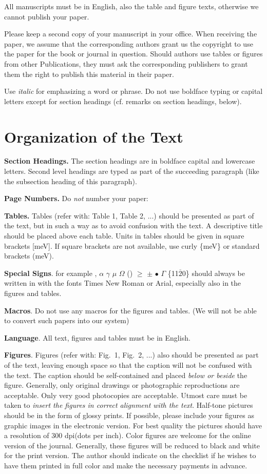 \documentclass{ttp}
\begin{document}
All manuscripts must be in English, also the table and figure texts, otherwise we cannot publish your paper.

Please keep a second copy of your manuscript in your office. When receiving the paper, we assume
that the corresponding authors grant us the copyright to use the paper for the book or journal in question.
Should authors use tables or figures from other Publications, they must ask the corresponding publishers to
grant them the right to publish this material in their paper.

Use \textit{italic} for emphasizing a word or phrase.
Do not use boldface typing or capital letters except for section headings (cf. remarks on section headings, below).

\section{Organization of the Text}

\noindent \textbf{Section Headings.} The section headings are in boldface capital and lowercase letters.
Second level headings are typed as part of the succeeding paragraph (like the subsection heading of this paragraph).

\textbf{Page Numbers.} Do \textit{not} number your paper:

\textbf{Tables.} Tables (refer with: Table 1, Table 2, ...) should be presented as part of the text, but in such a
way as to avoid confusion with the text. A descriptive title should be placed above each table. Units in tables should
 be given in square brackets [meV]. If square brackets are not available, use curly \{meV\} or standard brackets (meV).

\textbf{Special Signs}. for example , $\alpha$ $\gamma$  $\mu$ $\Omega$ () $\ge$  $\pm$ $\bullet$  $\Gamma$ \{11$\overline{2}$0\} should always be written in with the
fonts Times New Roman or Arial, especially also in the figures and tables.

\textbf{Macros}. Do not use any macros for the figures and tables. (We will not be able to convert such papers into our system)
\newpage

\textbf{Language}. All text, figures and tables must be in English.

\textbf{Figures}. Figures (refer with: Fig.~1, Fig.~2, ...) also should be presented as part of the text, leaving enough space so that the
caption will not be confused with the text. The caption should be self-contained and placed \textit{below or beside }the
figure. Generally, only original drawings or photographic reproductions are acceptable. Only very good photocopies are
acceptable. Utmost care must be taken to \textit{insert the figures in correct alignment with the text}. Half-tone pictures
 should be in the form of glossy prints. If possible, please include your figures as graphic images in the electronic version.
For best quality the pictures should have a resolution of 300 dpi(dots per inch).
\noindent Color figures are welcome for the online version of the journal. Generally, these figures will be reduced to black
and white for the print version. The author should indicate on the checklist if he wishes to have them printed in full color
and make the necessary payments in advance.
\end{document}
